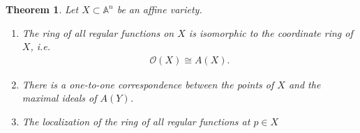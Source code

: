 \documentclass[11pt]{book}
\newtheorem{theorem}{Theorem}[section]
\theoremstyle{definition}
\numberwithin{equation}{section}
\begin{document}
\begin{thmbox}
    \begin{theorem}
        Let \(X \subset \mathbb{A}^n\) be an affine variety.
        \begin{enumerate}
            \item The ring of all regular functions on \(X\) is isomorphic to the coordinate ring of \(X\), i.e.
            \begin{align*}
                \mathcal{O}(X) \cong A(X) \text{.}
            \end{align*}
            \item There is a one-to-one correspondence between the points of \(X\) and the maximal ideals of \(A(Y)\).
            \item The localization of the ring of all regular functions at \(p \in X\)
        \end{enumerate}
    \end{theorem}
\end{thmbox}

\printbibliography
\end{document}
